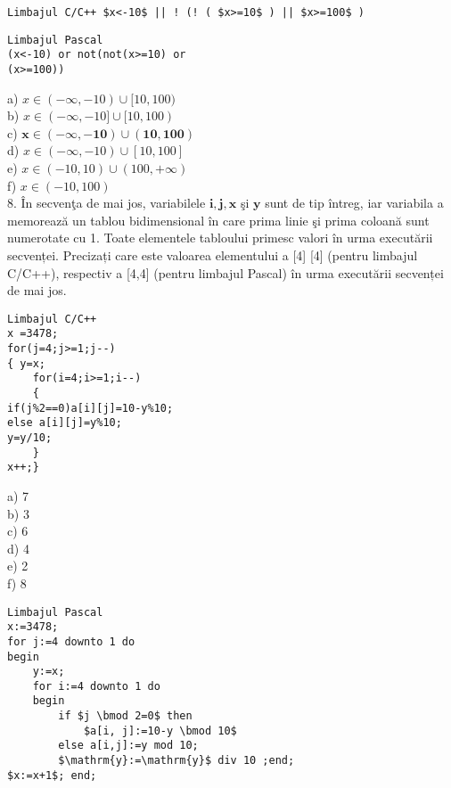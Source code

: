 \begin{verbatim}
Limbajul C/C++ $x<-10$ || ! (! ( $x>=10$ ) || $x>=100$ )
\end{verbatim}

\begin{verbatim}
Limbajul Pascal
(x<-10) or not(not(x>=10) or
(x>=100))
\end{verbatim}

a) $x \in(-\infty,-10) \cup[10,100)$\\
b) $x \in(-\infty,-10] \cup[10,100)$\\
c) $\mathbf{x} \in(-\infty,-\mathbf{1 0}) \cup(\mathbf{1 0}, \mathbf{1 0 0})$\\
d) $x \in(-\infty,-10) \cup[10,100]$\\
e) $x \in(-10,10) \cup(100,+\infty)$\\
f) $x \in(-10,100)$\\
8. În secvenţa de mai jos, variabilele $\mathbf{i}, \mathbf{j}, \mathbf{x}$ şi $\mathbf{y}$ sunt de tip întreg, iar variabila a memorează un tablou bidimensional în care prima linie şi prima coloană sunt numerotate cu 1. Toate elementele tabloului primesc valori în urma executării secvenței. Precizați care este valoarea elementului a [4] [4] (pentru limbajul C/C++), respectiv a [4,4] (pentru limbajul Pascal) în urma executării secvenței de mai jos.

\begin{verbatim}
Limbajul C/C++
x =3478;
for(j=4;j>=1;j--)
{ y=x;
    for(i=4;i>=1;i--)
    {
if(j%2==0)a[i][j]=10-y%10;
else a[i][j]=y%10;
y=y/10;
    }
x++;}
\end{verbatim}

a) 7\\
b) 3\\
c) 6\\
d) 4\\
e) 2\\
f) 8

\begin{verbatim}
Limbajul Pascal
x:=3478;
for j:=4 downto 1 do
begin
    y:=x;
    for i:=4 downto 1 do
    begin
        if $j \bmod 2=0$ then
            $a[i, j]:=10-y \bmod 10$
        else a[i,j]:=y mod 10;
        $\mathrm{y}:=\mathrm{y}$ div 10 ;end;
$x:=x+1$; end;
\end{verbatim}

